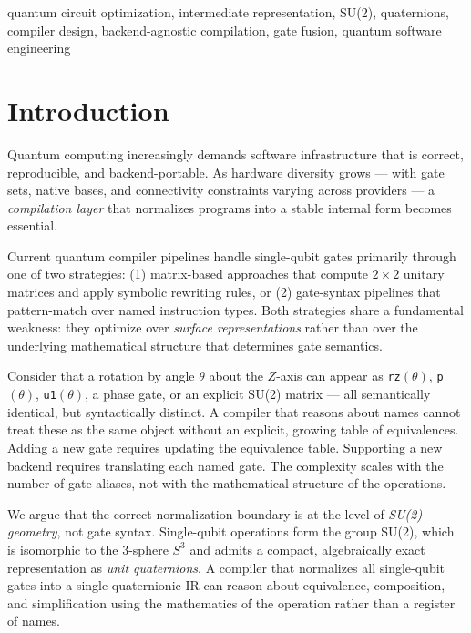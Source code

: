 \documentclass[conference]{IEEEtran}
\begin{document}
\begin{IEEEkeywords}
quantum circuit optimization, intermediate representation, SU(2), quaternions, compiler design,
backend-agnostic compilation, gate fusion, quantum software engineering
\end{IEEEkeywords}

\section{Introduction}

Quantum computing increasingly demands software infrastructure that is correct, reproducible,
and backend-portable. As hardware diversity grows --- with gate sets, native bases, and
connectivity constraints varying across providers --- a \textit{compilation layer} that
normalizes programs into a stable internal form becomes essential.

Current quantum compiler pipelines handle single-qubit gates primarily through one of two
strategies: (1) matrix-based approaches that compute $2{\times}2$ unitary matrices and apply
symbolic rewriting rules, or (2) gate-syntax pipelines that pattern-match over named
instruction types. Both strategies share a fundamental weakness: they optimize over
\textit{surface representations} rather than over the underlying mathematical structure that
determines gate semantics.

Consider that a rotation by angle $\theta$ about the $Z$-axis can appear as \texttt{rz}$(\theta)$,
\texttt{p}$(\theta)$, \texttt{u1}$(\theta)$, a phase gate, or an explicit SU(2) matrix --- all
semantically identical, but syntactically distinct. A compiler that reasons about names cannot
treat these as the same object without an explicit, growing table of equivalences. Adding a new
gate requires updating the equivalence table. Supporting a new backend requires translating each
named gate. The complexity scales with the number of gate aliases, not with the mathematical
structure of the operations.

We argue that the correct normalization boundary is at the level of \textit{SU(2) geometry},
not gate syntax. Single-qubit operations form the group SU(2), which is isomorphic to the
3-sphere $S^3$ and admits a compact, algebraically exact representation as \textit{unit
quaternions}. A compiler that normalizes all single-qubit gates into a single quaternionic IR
can reason about equivalence, composition, and simplification using the mathematics of the
operation rather than a register of names.
\end{document}
